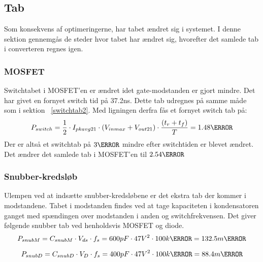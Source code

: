 \subsection{Tab}
Som konsekvens af optimeringerne, har tabet ændret sig i systemet. I denne sektion gennemgås de steder hvor tabet har ændret sig, hvorefter det samlede tab i converteren regnes igen.

\subsubsection{MOSFET}
Switchtabet i MOSFET'en er ændret idet gate-modstanden er gjort mindre. Det har givet en fornyet switch tid på 37.2ns. Dette tab udregnes på samme måde som i sektion ~\ref{switchtab2}. Med ligningen derfra fås et fornyet switch tab på:
\begin{equation}
P_{switch} = \frac{1}{2} \cdot I_{pkavg21} \cdot (V_{inmax}+V_{out21}) \cdot \frac{(t_r+t_f)}{T}= 1.48\watt
\end{equation} 
Der er altså et switchtab på $3\watt$ mindre efter switchtiden er blevet ændret. Det ændrer det samlede tab i MOSFET'en til $2.54\watt$

\subsubsection{Snubber-kredsløb}
Ulempen ved at indsætte snubber-kredsløbene er det ekstra tab der kommer i modstandene. Tabet i modstanden findes ved at tage kapaciteten i kondensatoren ganget med spændingen over modstanden i anden og switchfrekvensen\cite{snubber_power}.
Det giver følgende snubber tab ved henholdsvis MOSFET og diode.
\begin{equation}
P_{snubM} = C_{snubM}\cdot V_{ds} \cdot f_s = 600pF \cdot {47V}^2 \cdot 100k\hertz = 132.5m\watt
\end{equation} 

\begin{equation}
P_{snubD} = C_{snubD}\cdot V_{D} \cdot f_s = 400pF \cdot {47V}^2 \cdot 100k\hertz = 88.4m\watt
\end{equation} 


